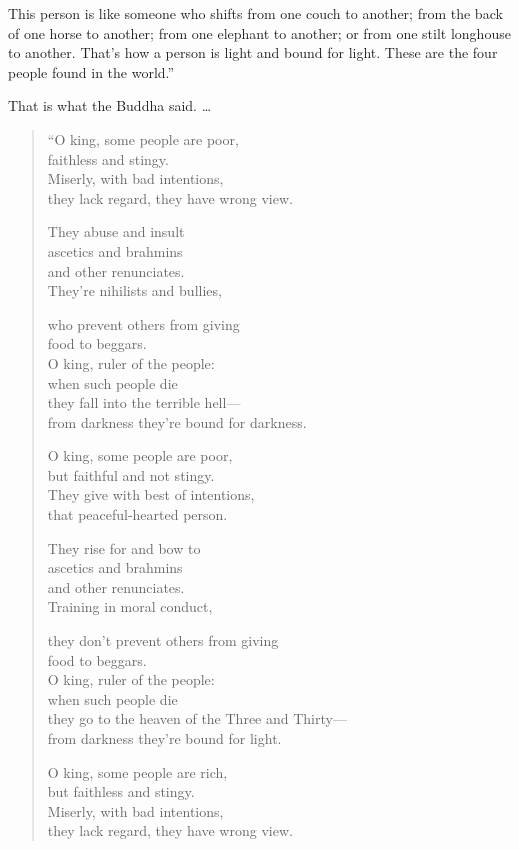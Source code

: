 \documentclass[12pt,openany]{book}%
\begin{document}
This person is like someone who shifts from one couch to another; from the back of one horse to another; from one elephant to another; or from one stilt longhouse to another. That’s how a person is light and bound for light. These are the four people found in the world.” 

That is what the Buddha said. … 

\begin{verse}%
“O king, some people are poor, \\
faithless and stingy. \\
Miserly, with bad intentions, \\
they lack regard, they have wrong view. 

They abuse and insult \\
ascetics and brahmins \\
and other renunciates. \\
They’re nihilists and bullies, 

who prevent others from giving \\
food to beggars. \\
O king, ruler of the people: \\
when such people die \\
they fall into the terrible hell—\\
from darkness they’re bound for darkness. 

O king, some people are poor, \\
but faithful and not stingy. \\
They give with best of intentions, \\
that peaceful-hearted person. 

They rise for and bow to \\
ascetics and brahmins \\
and other renunciates. \\
Training in moral conduct, 

they don’t prevent others from giving \\
food to beggars. \\
O king, ruler of the people: \\
when such people die \\
they go to the heaven of the Three and Thirty—\\
from darkness they’re bound for light. 

O king, some people are rich, \\
but faithless and stingy. \\
Miserly, with bad intentions, \\
they lack regard, they have wrong view. 


\end{verse}
\end{document}
